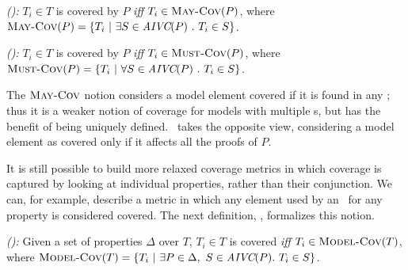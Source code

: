 \begin{definition} {\emph{(\maycov):}}
  \label{def:comp-1}
 $T_i \in T$ is covered by $P$ \emph{iff} $T_i \in \text{\sc May-Cov} (P)$, where
   $\text{\sc May-Cov} (P) = \{T_i ~|~ \exists S \in \textit{AIVC}(P)~.~T_i \in S \}$.
\end{definition}

\begin{definition} {\emph{(\mustcov):}}
  \label{def:mustcov}
 $T_i \in T$ is covered by $P$ \emph{iff} $T_i \in \text{\sc Must-Cov} (P)$, where
   $\text{\sc Must-Cov} (P) = \{T_i ~|~ \forall S \in \textit{AIVC}(P)~.~T_i \in S \}$.
\end{definition}

The $\text{\sc May-Cov}$ notion considers a model element covered if it is found in any \mivc ; thus it is a weaker notion of coverage for models with multiple \mivc s, but has the benefit of being uniquely defined.  \mustcov\ takes the opposite view, considering a model element as covered only if it affects all the proofs of $P$.

\iffalse
It is still possible to build more relaxed coverage metrics in which coverage
is captured by looking at individual properties, rather than their conjunction.
We can, for example, describe a metric in which any element used by an \mivc ~for any property is considered covered.
%
The next definition, \allcov, formalizes this notion.
\begin{definition} {\emph{(\allcov):}}
  \label{def:comp-2}
     Given a set of properties $\Delta$ over $T$, $T_i \in T$ is covered
   \emph{iff} $T_i \in \text{\sc Model-Cov} (T)$, where
   $\text{\sc Model-Cov} (T) = \{T_i ~|~ \exists P \in \Delta ,~ S \in \textit{AIVC}(P).~T_i \in S \}$.
\end{definition}

